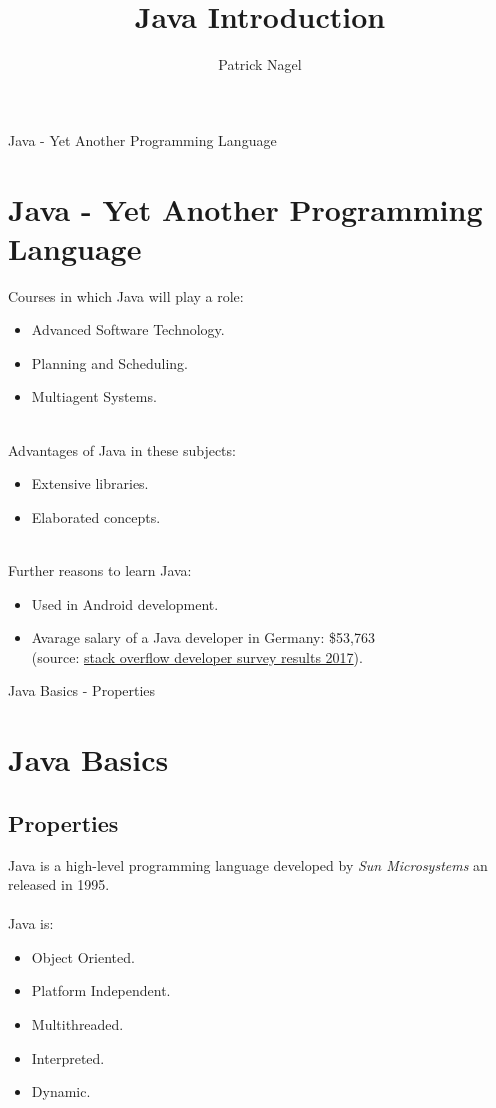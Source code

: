 \documentclass[11pt]{beamer}
\author{Patrick Nagel}
\title{Java Introduction}
\institute{University of Applied Sciences Bonn-Rhein-Sieg}
\newcommand{\nologo}{\setbeamertemplate{logo}{}}
\newcommand{\reducedfontsizesmall}{\fontsize{10pt}{12}\selectfont}
\begin{document}
	\begin{frame}
		\titlepage
	\end{frame}

	\begin{frame}
		\tableofcontents
	\end{frame}

	{\nologo
	\begin{frame}{Java - Yet Another Programming Language}
		\section{Java - Yet Another Programming Language}
		{\reducedfontsizesmall
		Courses in which Java will play a role:
		\begin{itemize}
			\item{Advanced Software Technology.}
			\item{Planning and Scheduling.}
			\item{Multiagent Systems.}
		\end{itemize}
	
		~\\
	
		Advantages of Java in these subjects:
		\begin{itemize}
			\item{Extensive libraries.}
			\item{Elaborated concepts.}
		\end{itemize}
		
		~\\
		
		Further reasons to learn Java:
		\begin{itemize}
			\item{Used in Android development.}
			\item{Avarage salary of a Java developer in Germany: \$53,763 \\(source: \href{https://insights.stackoverflow.com/survey/2017}{stack overflow developer survey results 2017}).}
		\end{itemize}
		}
	\end{frame}
	}

	
	\begin{frame}{Java Basics - Properties}
		\section{Java Basics}
		\subsection{Properties}
		Java is a high-level programming language developed by \textit{Sun Microsystems} an released in 1995.
		~\\
		~\\
		Java is:
		\begin{itemize}
			\item{Object Oriented.}
			\item{Platform Independent.}
			\item{Multithreaded.}
			\item{Interpreted.}
			\item{Dynamic.}
		\end{itemize}
	\end{frame}
	
\end{document}
